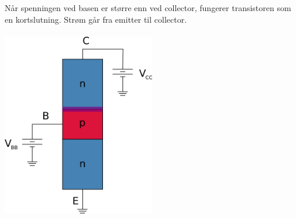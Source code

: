Når spenningen ved basen er større enn ved collector,
fungerer transistoren som en kortslutning.
Strøm går fra emitter til collector.
\\\\
\includegraphics[width=0.5\textwidth]{./img/npn-metning}
